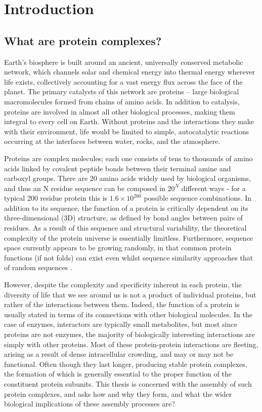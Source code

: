 \documentclass[a4paper,11pt,twoside,openright]{scrbook}
\begin{document}
\chapter{Introduction} \label{chapter:intro}

\section{What are protein complexes?}
Earth’s biosphere is built around an ancient, universally conserved metabolic
network, which channels solar and chemical energy into thermal energy wherever
life exists, collectively accounting for a vast energy flux across the face of
the planet. The primary catalysts of this network are proteins – large
biological macromolecules formed from chains of amino acids. In addition to
catalysis, proteins are involved in almost all other biological processes,
making them integral to every cell on Earth. Without proteins and the
interactions they make with their environment, life would be limited to simple,
autocatalytic reactions occurring at the interfaces between water, rocks, and
the atmosphere.

Proteins are complex molecules; each one consists of tens to thousands of amino
acids linked by covalent peptide bonds between their terminal amine and carboxyl
groups. There are 20 amino acids widely used by biological organisms, and thus
an N residue sequence can be composed in \(20^{N}\) different ways - for a
typical 200 residue protein this is \(1.6 \times 10^{260}\) possible sequence
combinations. In addition to its sequence, the function of a protein is
critically dependent on its three-dimensional (3D) structure, as defined by bond
angles between pairs of residues. As a result of this sequence and structural
variability, the theoretical complexity of the protein universe is essentially
limitless. Furthermore, sequence space currently appears to be growing randomly,
in that common protein functions (if not folds) can exist even whilst sequence
similarity approaches that of random sequences
\cite{Larson2002,Povolotskaya2010}.

However, despite the complexity and specificity inherent in each protein, the
diversity of life that we see around us is not a product of individual proteins,
but rather of the interactions between them. Indeed, the function of a protein
is usually stated in terms of its connections with other biological molecules.
In the case of enzymes, interactors are typically small metabolites, but most
since proteins are not enzymes, the majority of biologically interesting
interactions are simply with other proteins. Most of these protein-protein
interactions are fleeting, arising as a result of dense intracellular crowding,
and may or may not be functional. Often though they last longer, producing
stable protein complexes, the formation of which is generally essential to the
proper function of the constituent protein subunits. This thesis is concerned
with the assembly of such protein complexes, and asks how and why they form, and
what the wider biological implications of these assembly processes are?
\end{document}
